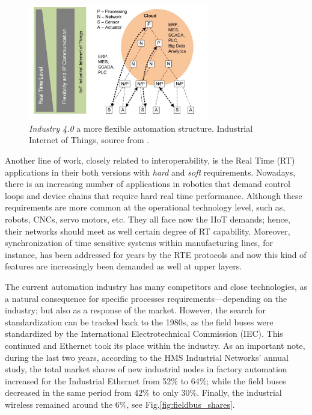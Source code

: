 \begin{figure}[h]
    \centering
    \includegraphics[width=0.7\textwidth]{imgs/intro-industryarchitecture.jpg}
    \caption{\emph{Industry 4.0} a more flexible automation structure. Industrial Internet of Things, source from \cite{tsn_intro}.}
    \label{fig:pyramid-iiot}
\end{figure}

Another line of work, closely related to interoperability, is the Real Time (RT) applications in their both versions with \emph{hard} and \emph{soft} requirements. 
Nowadays, there is an increasing number of applications in robotics that demand control loops and device chains that
require hard real time performance. Although these requirements are more common at the operational technology level, such as, robots, CNCs, servo motors, etc. 
They all face now the IIoT demands; hence, their networks should meet as well certain degree of RT capability. 
Moreover, synchronization of time sensitive
systems within manufacturing lines, for instance, has been addressed for years by the RTE protocols and now this kind of features are increasingly
been demanded as well at upper layers.

The current automation industry has many competitors and close technologies, as a natural consequence for specific processes requirements---depending on the industry;
but also as a response of the market. However, the search for standardization
can be tracked back to the 1980s, as the field buses were standardized by the International Electrotechnical Commission (IEC). 
This continued and Ethernet took its place within the industry. As an important note, during the last two years, according to the HMS Industrial Networks' annual study,
the total market shares of new industrial nodes in factory automation increased for the Industrial Ethernet from \num{52}$\%$ to \num{64}$\%$; while the
field buses decreased in the same period from $42\%$ to only $30\%$. Finally, the industrial wireless remained around the \num{6}$\%$, see Fig.\ref{fig:fieldbus_shares}.

